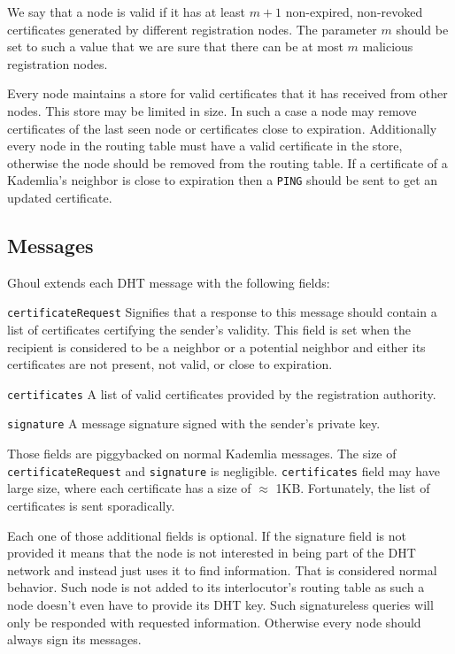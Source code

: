 We say that a node is valid if it has at least $m + 1$ non-expired, non-revoked
certificates generated by different registration nodes. The parameter $m$ should
be set to such a value that we are sure that there can be at most $m$ malicious
registration nodes.

Every node maintains a store for valid certificates that it has received from
other nodes. This store may be limited in size. In such a case a node may remove
certificates of the last seen node or certificates close to expiration.
Additionally every node in the routing table must have a valid certificate in
the store, otherwise the node should be removed from the routing table. If a
certificate of a Kademlia's neighbor is close to expiration then a
\texttt{PING} should be sent to get an updated certificate.

\subsection{Messages}
Ghoul extends each DHT message with the following fields:
\begin{description}
  \item{\texttt{certificateRequest}} Signifies that a response to this message
    should contain a list of certificates certifying the sender's validity.
    This field is set when the recipient is considered to be a neighbor or a
    potential neighbor and either its certificates are not present, not valid,
    or close to expiration.
  \item{\texttt{certificates}} A list of valid certificates provided by the
    registration authority.
  \item{\texttt{signature}} A message signature signed with the sender's private
    key.
\end{description}

Those fields are piggybacked on normal Kademlia messages. The size of
\texttt{certificateRequest} and \texttt{signature} is negligible.
\texttt{certificates} field may have large size, where each certificate has a
size of $\approx$ 1KB. Fortunately, the list of certificates is sent
sporadically.

Each one of those additional fields is optional. If the signature field is not
provided it means that the node is not interested in being part of the DHT
network and instead just uses it to find information.
That is considered normal behavior.
Such node is not added to its interlocutor's routing table as such a node
doesn't even have to provide its DHT key.
Such signatureless queries will only be responded with requested information.
Otherwise every node should always sign its messages.


